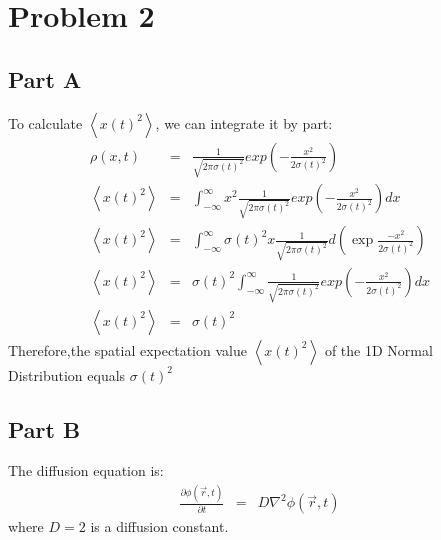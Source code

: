 \documentclass{article}
\begin{document}
\section{Problem 2}
\subsection{Part A}
\quad To calculate $\left<x(t)^2\right>$, we can integrate it by part:
\begin{eqnarray}
  \nonumber \rho(x,t) &=& \frac{1}{\sqrt{2\pi \sigma(t)^2}}exp\left(-\frac{x^2}{2\sigma (t)^2}\right) \\
  \nonumber \left<x(t)^2\right> &=& \int_{-\infty}^{\infty} x^2\frac{1}{\sqrt{2\pi \sigma(t)^2}}exp\left(-\frac{x^2}{2\sigma (t)^2}\right)dx \\
  \nonumber \left<x(t)^2\right> &=& \int_{-\infty}^{\infty} \sigma(t)^2x\frac{1}{\sqrt{2\pi \sigma(t)^2}}d\left(\exp{\frac{-x^2}{2\sigma (t)^2}}\right)  \\
  \nonumber \left<x(t)^2\right> &=& \sigma(t)^2\int_{-\infty}^{\infty} \frac{1}{\sqrt{2\pi \sigma(t)^2}}exp\left(-\frac{x^2}{2\sigma (t)^2}\right)dx  \\
  \nonumber \left<x(t)^2\right> &=& \sigma(t)^2
\end{eqnarray}
\quad Therefore,the spatial expectation value $\left<x(t)^2\right>$ of the 1D Normal Distribution equals $\sigma(t)^2$
\subsection{Part B}
\quad The diffusion equation is:
\begin{eqnarray}
  \nonumber \frac{\partial\phi(\vec r, t)}{\partial t} &=& D\nabla^2 \phi(\vec r, t)
\end{eqnarray}
\quad where $D=2$ is a diffusion constant.
\end{document}
